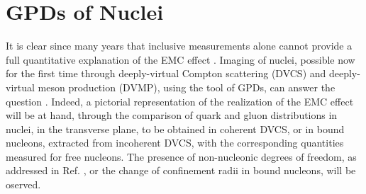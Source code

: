 \section{GPDs of Nuclei}

It is clear since many years that inclusive measurements alone cannot
provide a 
full quantitative explanation of the EMC
effect \cite{Aubert:1983xm}.
Imaging of nuclei, possible now for the first time
through deeply-virtual Compton scattering (DVCS) and deeply-virtual meson production (DVMP), using the tool of GPDs, can
answer the question \cite{Dupre:2015jha}. Indeed,
a pictorial representation of the realization of the
EMC effect will be at hand, through the comparison of 
quark and gluon distributions 
in nuclei, in the transverse plane, to be obtained in coherent DVCS, or 
in bound nucleons, extracted from incoherent DVCS, with the corresponding
quantities measured for free nucleons.
The presence of non-nucleonic degrees of freedom, 
as addressed in Ref. \cite{Berger:2001zb},
or the 
change of confinement radii in bound nucleons, will be oserved. 

